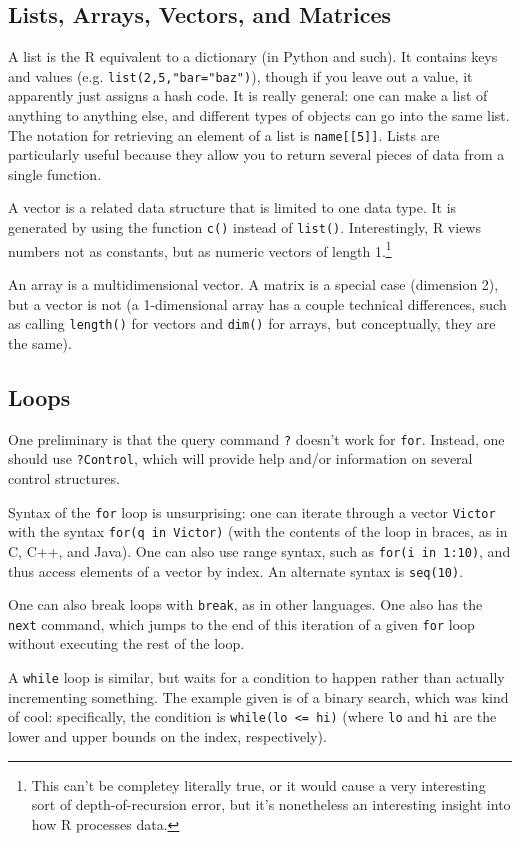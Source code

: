 \subsection{Lists, Arrays, Vectors, and Matrices}
A list is the R equivalent to a dictionary (in Python and such). It contains keys and values (e.g. \texttt{list(2,5,"bar="baz")}), though if you leave out a value, it apparently just assigns a hash code. It is really general: one can make a list of anything to anything else, and different types of objects can go into the same list. The notation for retrieving an element of a list is \texttt{name[[5]]}. Lists are particularly useful because they allow you to return several pieces of data from a single function.

A vector is a related data structure that is limited to one data type. It is generated by using the function \texttt{c()} instead of \texttt{list()}. Interestingly, R views numbers not as constants, but as numeric vectors of length 1.\footnote{This can't be completey literally true, or it would cause a very interesting sort of depth-of-recursion error, but it's nonetheless an interesting insight into how R processes data.}

An array is a multidimensional vector. A matrix is a special case (dimension 2), but a vector is not (a 1-dimensional array has a couple technical differences, such as calling \texttt{length()} for vectors and \texttt{dim()} for arrays, but conceptually, they are the same).
\subsection{Loops}
One preliminary is that the query command \texttt{?} doesn't work for \texttt{for}. Instead, one should use \texttt{?Control}, which will provide help and/or information on several control structures. 

Syntax of the \texttt{for} loop is unsurprising: one can iterate through a vector \texttt{Victor} with the syntax \texttt{for(q in Victor)} (with the contents of the loop in braces, as in C, C++, and Java). One can also use range syntax, such as \texttt{for(i in 1:10)}, and thus access elements of a vector by index. An alternate syntax is \texttt{seq(10)}.

One can also break loops with \texttt{break}, as in other languages. One also has the \texttt{next} command, which jumps to the end of this iteration of a given \texttt{for} loop without executing the rest of the loop.

A \texttt{while} loop is similar, but waits for a condition to happen rather than actually incrementing something. The example given is of a binary search, which was kind of cool: specifically, the condition is \texttt{while(lo <= hi)} (where \texttt{lo} and \texttt{hi} are the lower and upper bounds on the index, respectively).

